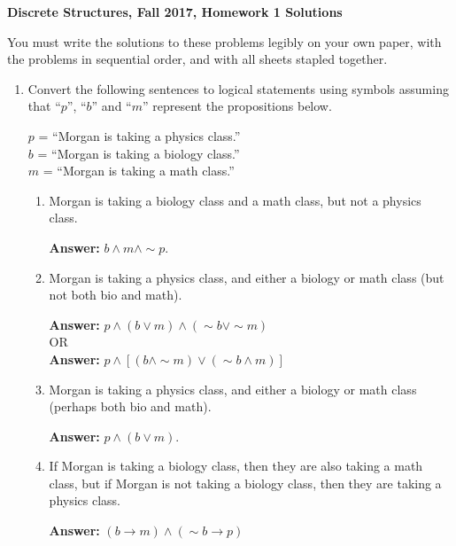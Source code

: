 \documentclass[12pt, letterpaper]{report}
\newcommand{\nott}{{\sim}}
\newcommand{\ans}{\textbf{Answer: }}
\begin{document}
{\textbf{Discrete Structures, Fall 2017, Homework 1 Solutions}}

\medbreak


You must write the solutions to these problems legibly on your own paper, with
the problems in sequential order, and with all sheets stapled together.

\medbreak

\begin{enumerate}

	\item Convert the following sentences to logical statements using symbols assuming that ``$p$'', ``$b$''
	and ``$m$'' represent the propositions below.  
	
	$p$ = ``Morgan is taking a physics class.'' \\
	$b$ = ``Morgan is taking a biology class.'' \\
	$m$ = ``Morgan is taking a math class.''
	
	\begin{enumerate}
		\item Morgan is taking a biology class and a math class, but not a physics class.
		
		\ans $b \land m \land \nott p$.
		
		\item Morgan is taking a physics class, and either a biology or math class (but not both bio and math).
		
		\ans $p \land (b \lor m) \land (\nott b \lor \nott m)$
		\\ OR \\
		\ans $p \land [(b \land \nott m) \lor (\nott b \land m)]$
		
		\item Morgan is taking a physics class, and either a biology or math class (perhaps both bio and math).
		
		\ans $p \land (b \lor m)$.
		
		\item If Morgan is taking a biology class, then they are also taking a math class, but if Morgan is not taking a 
		biology class, then they are taking a physics class.
		
		\ans $(b \to m) \land (\nott b \to p)$
	\end{enumerate}


\end{enumerate}
\end{document}
